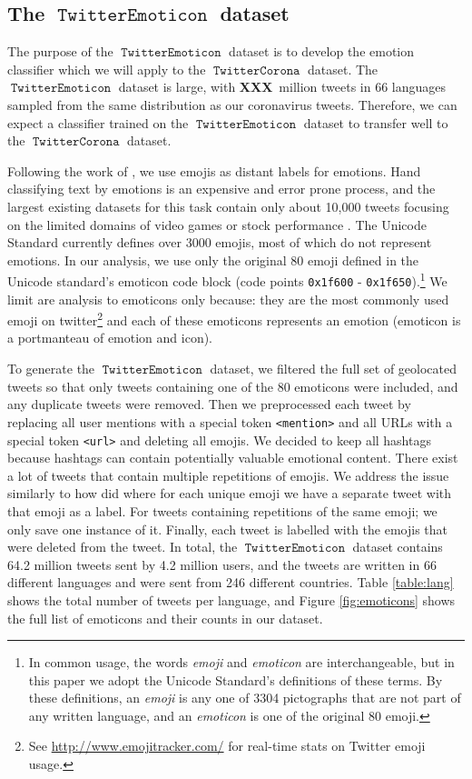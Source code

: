 \documentclass[11pt]{article}
\newcommand{\defn}[1]{\emph{{#1}}}
\newcommand{\XXX}{\textbf{XXX}~}
\DeclareMathOperator{\emoticon}{\texttt{TwitterEmoticon}}
\DeclareMathOperator{\corona}{\texttt{TwitterCorona}}
\begin{document}
\subsection {The $\emoticon$ dataset}

The purpose of the $\emoticon$ dataset is to develop the emotion classifier which we will apply to the $\corona$ dataset.
The $\emoticon$ dataset is large, with \XXX million tweets in 66 languages sampled from the same distribution as our coronavirus tweets.
Therefore, we can expect a classifier trained on the $\emoticon$ dataset to transfer well to the $\corona$ dataset.

Following the work of \citet{fixme1,fixme2,fixme3}, we use emojis as distant labels for emotions.
Hand classifying text by emotions is an expensive and error prone process,
and the largest existing datasets for this task contain only about 10,000 tweets focusing on the limited domains of video games \citep{fixme} or stock performance \citep{fixme}.
The Unicode Standard \citep{fixme} currently defines over 3000 emojis,
most of which do not represent emotions.
In our analysis, we use only the original 80 emoji defined in the Unicode standard's emoticon code block (code points \texttt{0x1f600} - \texttt{0x1f650}).\footnote{
    In common usage, the words \defn{emoji} and \defn{emoticon} are interchangeable,
    but in this paper we adopt the Unicode Standard's definitions of these terms.
    By these definitions, an \defn{emoji} is any one of 3304 pictographs that are not part of any written language,
    and an \defn{emoticon} is one of the original 80 emoji.
}
We limit are analysis to emoticons only because:
they are the most commonly used emoji on twitter\footnote{
    See \url{http://www.emojitracker.com/} for real-time stats on Twitter emoji usage.
}
and each of these emoticons represents an emotion (emoticon is a portmanteau of emotion and icon).

To generate the $\emoticon$ dataset, 
we filtered the full set of geolocated tweets so that only tweets containing one of the 80 emoticons were included,
and any duplicate tweets were removed.
Then we preprocessed each tweet by replacing all user mentions with a special token \texttt{<mention>} and all URLs with a special token \texttt{<url>} and deleting all emojis.
We decided to keep all hashtags because hashtags can contain potentially valuable emotional content.
There exist a lot of tweets that contain multiple repetitions of emojis.
We address the issue similarly to how \cite{100 million tweets} did where for each unique emoji we have a separate tweet with that emoji as a label. 
For tweets containing repetitions of the same emoji; we only save one instance of it.
Finally, each tweet is labelled with the emojis that were deleted from the tweet.
In total, the $\emoticon$ dataset contains 64.2 million tweets sent by 4.2 million users,
and the tweets are written in 66 different languages and were sent from 246 different countries.
Table \ref{table:lang} shows the total number of tweets per language,
and Figure \ref{fig:emoticons} shows the full list of emoticons and their counts in our dataset. 
\end{document}
